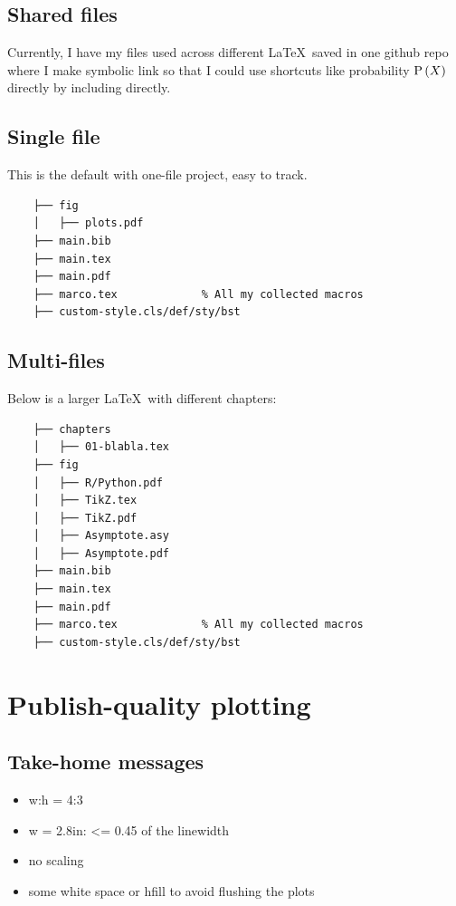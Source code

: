 \documentclass[aos,preprint]{imsart}
\begin{document}
\subsection{Shared files}

Currently, I have my files used across different \LaTeX\ saved in one
github repo where I make symbolic link so that I could use shortcuts like probability
$\operatorname{\mathrm{P}} \left( {X} \right)$ directly by including directly.

\subsection{Single file}

This is the default with one-file project, easy to track.

\begin{Verbatim}
	├── fig
	│   ├── plots.pdf
	├── main.bib
	├── main.tex
	├── main.pdf
	├── marco.tex             % All my collected macros
	├── custom-style.cls/def/sty/bst
\end{Verbatim}

\subsection{Multi-files}

Below is a larger \LaTeX\ with different chapters:

\begin{Verbatim}
	├── chapters
	│   ├── 01-blabla.tex
	├── fig
	│   ├── R/Python.pdf
	│   ├── TikZ.tex
	│   ├── TikZ.pdf
	│   ├── Asymptote.asy
	│   ├── Asymptote.pdf
	├── main.bib
	├── main.tex
	├── main.pdf
	├── marco.tex             % All my collected macros
	├── custom-style.cls/def/sty/bst
\end{Verbatim}


\newpage

\section{Publish-quality plotting}

\subsection{Take-home messages}

\begin{itemize}
	\item w:h = 4:3
	\item w = 2.8in: <= 0.45 of the linewidth
	\item no scaling
	\item some white space or hfill to avoid flushing the plots
\end{itemize}
\end{document}
